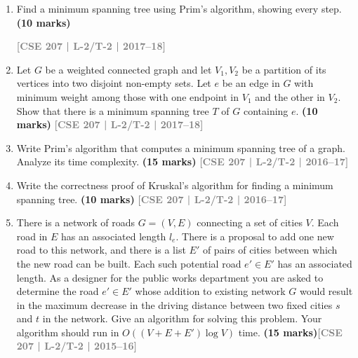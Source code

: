 \documentclass[12pt,a3paper]{article}
\newcommand{\yr}[1]{\hfill\textcolor{gray}{\small\textbf{[#1]}}}
\newcommand{\mk}[1]{\textcolor{orange!70!black}{\small\textbf{(#1 marks)}}}
\begin{document}
\begin{enumerate}
\item Find a minimum spanning tree using Prim's algorithm, showing every step. \mk{10}

\begin{center}

\end{center}
\yr{CSE 207 | L-2/T-2 | 2017--18}

\item Let $G$ be a weighted connected graph and let $V_1, V_2$ be a partition of its vertices into two disjoint non-empty sets. Let $e$ be an edge in $G$ with minimum weight among those with one endpoint in $V_1$ and the other in $V_2$. Show that there is a minimum spanning tree $T$ of $G$ containing $e$. \mk{10}
\yr{CSE 207 | L-2/T-2 | 2017--18}

\item Write Prim's algorithm that computes a minimum spanning tree of a graph. Analyze its time complexity. \mk{15}
\yr{CSE 207 | L-2/T-2 | 2016--17}

\item Write the correctness proof of Kruskal's algorithm for finding a minimum spanning tree. \mk{10}
\yr{CSE 207 | L-2/T-2 | 2016--17}

\item There is a network of roads $G = (V, E)$ connecting a set of cities $V$.
Each road in $E$ has an associated length $l_e$. There is a proposal to add one
new road to this network, and there is a list $E'$ of pairs of cities between
which the new road can be built. Each such potential road $e' \in E'$ has an
associated length. As a designer for the public works department you are asked
to determine the road $e' \in E'$ whose addition to existing network $G$ would
result in the maximum decrease in the driving distance between two fixed cities
$s$ and $t$ in the network. Give an algorithm for solving this problem. Your
algorithm should run in $O((V + E + E') \log V)$ time. \mk{15}\yr{CSE 207 | L-2/T-2 | 2015--16}


\end{enumerate}
\end{document}
